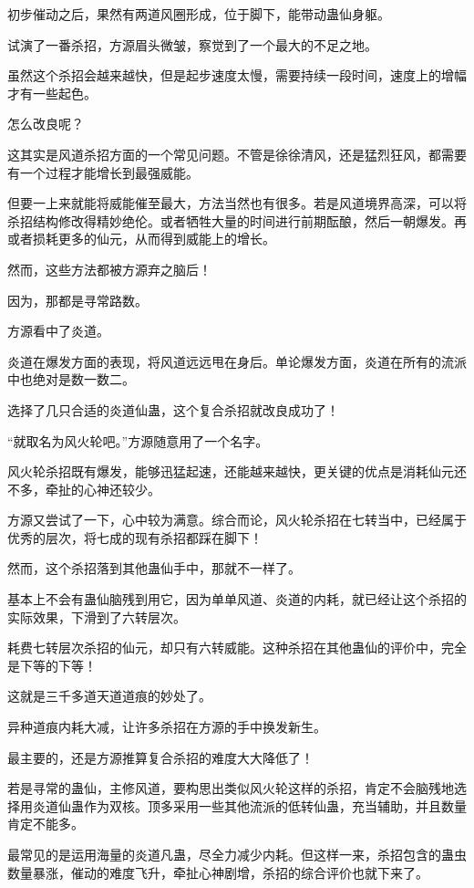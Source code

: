 \begin{this_body}
初步催动之后，果然有两道风圈形成，位于脚下，能带动蛊仙身躯。

试演了一番杀招，方源眉头微皱，察觉到了一个最大的不足之地。

虽然这个杀招会越来越快，但是起步速度太慢，需要持续一段时间，速度上的增幅才有一些起色。

怎么改良呢？

这其实是风道杀招方面的一个常见问题。不管是徐徐清风，还是猛烈狂风，都需要有一个过程才能增长到最强威能。

但要一上来就能将威能催至最大，方法当然也有很多。若是风道境界高深，可以将杀招结构修改得精妙绝伦。或者牺牲大量的时间进行前期酝酿，然后一朝爆发。再或者损耗更多的仙元，从而得到威能上的增长。

然而，这些方法都被方源弃之脑后！

因为，那都是寻常路数。

方源看中了炎道。

炎道在爆发方面的表现，将风道远远甩在身后。单论爆发方面，炎道在所有的流派中也绝对是数一数二。

选择了几只合适的炎道仙蛊，这个复合杀招就改良成功了！

“就取名为风火轮吧。”方源随意用了一个名字。

风火轮杀招既有爆发，能够迅猛起速，还能越来越快，更关键的优点是消耗仙元还不多，牵扯的心神还较少。

方源又尝试了一下，心中较为满意。综合而论，风火轮杀招在七转当中，已经属于优秀的层次，将七成的现有杀招都踩在脚下！

然而，这个杀招落到其他蛊仙手中，那就不一样了。

基本上不会有蛊仙脑残到用它，因为单单风道、炎道的内耗，就已经让这个杀招的实际效果，下滑到了六转层次。

耗费七转层次杀招的仙元，却只有六转威能。这种杀招在其他蛊仙的评价中，完全是下等的下等！

这就是三千多道天道道痕的妙处了。

异种道痕内耗大减，让许多杀招在方源的手中换发新生。

最主要的，还是方源推算复合杀招的难度大大降低了！

若是寻常的蛊仙，主修风道，要构思出类似风火轮这样的杀招，肯定不会脑残地选择用炎道仙蛊作为双核。顶多采用一些其他流派的低转仙蛊，充当辅助，并且数量肯定不能多。

最常见的是运用海量的炎道凡蛊，尽全力减少内耗。但这样一来，杀招包含的蛊虫数量暴涨，催动的难度飞升，牵扯心神剧增，杀招的综合评价也就下来了。


\end{this_body}
